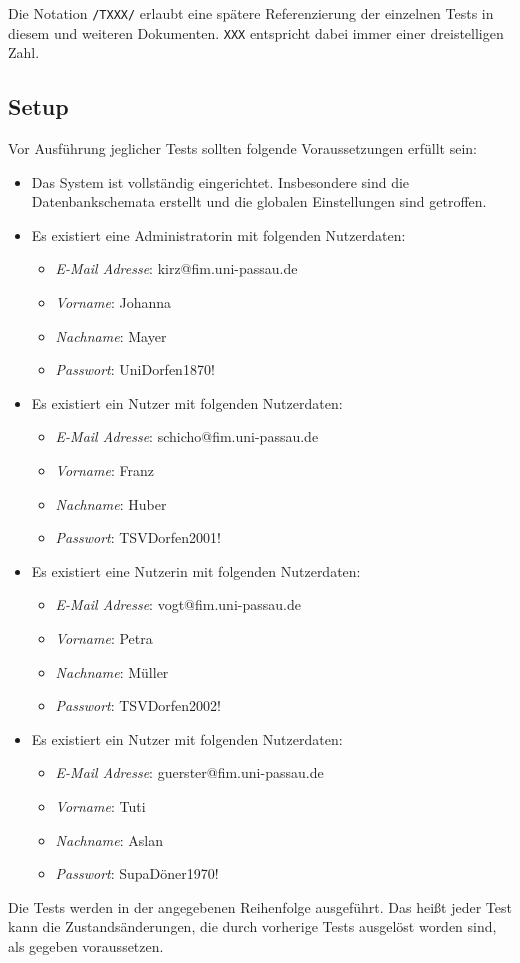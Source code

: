
Die Notation \texttt{/TXXX/} erlaubt eine spätere Referenzierung der einzelnen Tests in diesem und weiteren
Dokumenten. \texttt{XXX} entspricht dabei immer einer dreistelligen Zahl.
\subsection{Setup}\label{setup}
Vor Ausführung jeglicher Tests sollten folgende Voraussetzungen erfüllt sein:
\begin{itemize}
	\item Das System ist vollständig eingerichtet.
	Insbesondere sind die Datenbankschemata erstellt und die globalen Einstellungen sind getroffen.
	\item Es existiert eine Administratorin mit folgenden Nutzerdaten:
	\begin{itemize}
		\item \emph{E-Mail Adresse}: kirz@fim.uni-passau.de
		\item \emph{Vorname}: Johanna
		\item \emph{Nachname}: Mayer
		\item \emph{Passwort}: UniDorfen1870!
	\end{itemize}
	\item Es existiert ein Nutzer mit folgenden Nutzerdaten:
	\begin{itemize}
		\item \emph{E-Mail Adresse}: schicho@fim.uni-passau.de
		\item \emph{Vorname}: Franz
		\item \emph{Nachname}: Huber
		\item \emph{Passwort}: TSVDorfen2001!
	\end{itemize}
	\item Es existiert eine Nutzerin mit folgenden Nutzerdaten:
	\begin{itemize}
		\item \emph{E-Mail Adresse}: vogt@fim.uni-passau.de
		\item \emph{Vorname}: Petra
		\item \emph{Nachname}: Müller
		\item \emph{Passwort}: TSVDorfen2002!
	\end{itemize}
	\item Es existiert ein Nutzer mit folgenden Nutzerdaten:
	\begin{itemize}
		\item \emph{E-Mail Adresse}: guerster@fim.uni-passau.de
		\item \emph{Vorname}: Tuti
		\item \emph{Nachname}: Aslan
		\item \emph{Passwort}: SupaDöner1970!
	\end{itemize}
\end{itemize}
Die Tests werden in der angegebenen Reihenfolge ausgeführt.
Das heißt jeder Test kann die Zustandsänderungen, die durch vorherige Tests ausgelöst worden sind, als gegeben voraussetzen.

